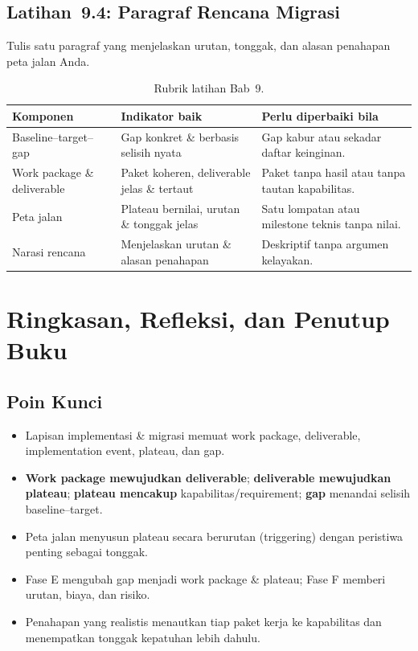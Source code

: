 \subsection*{Latihan~9.4: Paragraf Rencana Migrasi}
Tulis satu paragraf yang menjelaskan urutan, tonggak, dan alasan penahapan peta
jalan Anda.

\begin{table}[htbp]
\centering
\scriptsize
\caption{Rubrik latihan Bab~9.}
\label{tab:rubrik-bab8-impl}
\begin{tabularx}{\textwidth}{@{}p{} X X@{}}
\hline
\textbf{Komponen} & \textbf{Indikator baik} & \textbf{Perlu diperbaiki bila} \\
\hline
Baseline--target--gap & Gap konkret \& berbasis selisih nyata & Gap kabur atau
sekadar daftar keinginan. \\
Work package \& deliverable & Paket koheren, deliverable jelas \& tertaut & Paket
tanpa hasil atau tanpa tautan kapabilitas. \\
Peta jalan & Plateau bernilai, urutan \& tonggak jelas & Satu lompatan atau
milestone teknis tanpa nilai. \\
Narasi rencana & Menjelaskan urutan \& alasan penahapan & Deskriptif tanpa
argumen kelayakan. \\
\hline
\end{tabularx}
\end{table}

\section{Ringkasan, Refleksi, dan Penutup Buku}

\subsection*{Poin Kunci}
\begin{itemize}
  \item Lapisan implementasi \& migrasi memuat work package, deliverable,
        implementation event, plateau, dan gap.
  \item \textbf{Work package mewujudkan deliverable}; \textbf{deliverable
        mewujudkan plateau}; \textbf{plateau mencakup} kapabilitas/requirement;
        \textbf{gap} menandai selisih baseline--target.
  \item Peta jalan menyusun plateau secara berurutan (triggering) dengan peristiwa
        penting sebagai tonggak.
  \item Fase E mengubah gap menjadi work package \& plateau; Fase F memberi urutan,
        biaya, dan risiko.
  \item Penahapan yang realistis menautkan tiap paket kerja ke kapabilitas dan
        menempatkan tonggak kepatuhan lebih dahulu.
\end{itemize}

